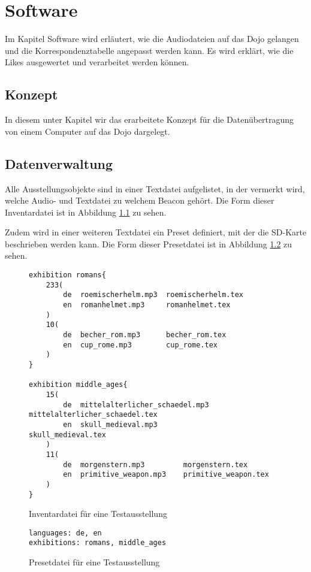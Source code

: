 \chapter{Software}
\label{Software}
\thispagestyle{fancy} 
Im Kapitel Software wird erläutert, wie die Audiodateien auf das Dojo gelangen und die Korrespondenztabelle angepasst werden kann. Es wird erklärt, wie die Likes ausgewertet und verarbeitet werden können.
\section{Konzept}
In diesem unter Kapitel wir das erarbeitete Konzept für die Datenübertragung von einem Computer auf das Dojo dargelegt.

\section{Datenverwaltung}
Alle Ausstellungsobjekte sind in einer Textdatei aufgelistet, in der vermerkt wird, welche Audio- und Textdatei zu welchem Beacon gehört.
Die Form dieser Inventardatei ist in Abbildung \ref{inventory_syntax} zu sehen.

Zudem wird in einer weiteren Textdatei ein Preset definiert, mit der die SD-Karte beschrieben werden kann.
Die Form dieser Presetdatei ist in Abbildung \ref{preset_syntax} zu sehen.

\begin{figure}[h]
	\begin{verbatim}
exhibition romans{
    233(
        de  roemischerhelm.mp3  roemischerhelm.tex
        en  romanhelmet.mp3     romanhelmet.tex
    )
    10(
        de  becher_rom.mp3      becher_rom.tex
        en  cup_rome.mp3        cup_rome.tex
    )
}

exhibition middle_ages{
    15(
        de  mittelalterlicher_schaedel.mp3  mittelalterlicher_schaedel.tex
        en  skull_medieval.mp3              skull_medieval.tex
    )
    11(
        de  morgenstern.mp3         morgenstern.tex
        en  primitive_weapon.mp3    primitive_weapon.tex
    )
}
	\end{verbatim}
	\caption{Inventardatei für eine Testausstellung}
	\label{inventory_syntax}
\end{figure}

\begin{figure}[h]
	\begin{verbatim}
languages: de, en
exhibitions: romans, middle_ages
	\end{verbatim}
	\caption{Presetdatei für eine Testausstellung}
	\label{preset_syntax}
\end{figure}

